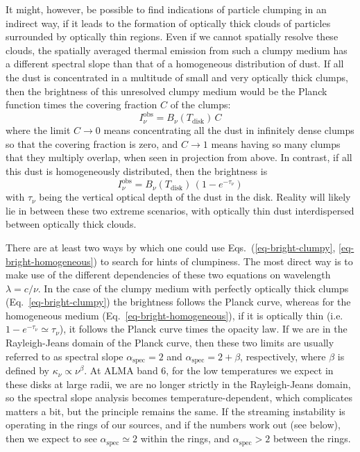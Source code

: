 \documentclass{aa}
\begin{document}
It might, however, be possible to find indications of particle clumping in an
indirect way, if it leads to the formation of optically thick clouds of
particles surrounded by optically thin regions. Even if we cannot spatially
resolve these clouds, the spatially averaged thermal emission from such a clumpy
medium has a different spectral slope than that of a homogeneous distribution of
dust. If all the dust is concentrated in a multitude of small and very optically
thick clumps, then the brightness of this unresolved clumpy medium would be the
Planck function times the covering fraction $C$ of the clumps:
\begin{equation}\label{eq-bright-clumpy}
I_\nu^{\mathrm{obs}} = B_\nu(T_{\mathrm{disk}})\,C
\end{equation}
where the limit $C\rightarrow 0$ means concentrating all the dust in infinitely
dense clumps so that the covering fraction is zero, and $C\rightarrow 1$ means
having so many clumps that they multiply overlap, when seen in projection from
above. In contrast, if all this dust is homogeneously distributed, then the
brightness is
\begin{equation}\label{eq-bright-homogeneous}
I_\nu^{\mathrm{obs}} = B_\nu(T_{\mathrm{disk}})\,(1-e^{-\tau_\nu})
\end{equation}
with $\tau_\nu$ being the vertical optical depth of the dust in the disk.
Reality will likely lie in between these two extreme scenarios, with
optically thin dust interdispersed between optically thick clouds.

There are at least two ways by which one could use Eqs.~(\ref{eq-bright-clumpy},
\ref{eq-bright-homogeneous}) to search for hints of clumpiness. The most direct
way is to make use of the different dependencies of these two equations on
wavelength $\lambda=c/\nu$. In the case of the clumpy medium with perfectly
optically thick clumps (Eq.~\ref{eq-bright-clumpy}) the brightness follows the
Planck curve, whereas for the homogeneous medium
(Eq.~\ref{eq-bright-homogeneous}), if it is optically thin
(i.e.~$1-e^{-\tau_\nu}\simeq \tau_\nu$), it follows the Planck curve times the
opacity law. If we are in the Rayleigh-Jeans domain of the Planck curve, then
these two limits are usually referred to as spectral slope
$\alpha_{\mathrm{spec}}=2$ and $\alpha_{\mathrm{spec}}=2+\beta$, respectively,
where $\beta$ is defined by $\kappa_\nu\propto \nu^\beta$. At ALMA band 6, for
the low temperatures we expect in these disks at large radii, we are no longer
strictly in the Rayleigh-Jeans domain, so the spectral slope analysis becomes
temperature-dependent, which complicates matters a bit, but the principle
remains the same. If the streaming instability is operating in the rings of our
sources, and if the numbers work out (see below), then we expect to see
$\alpha_{\mathrm{spec}}\simeq 2$ within the rings, and
$\alpha_{\mathrm{spec}}>2$ between the rings.
\end{document}
